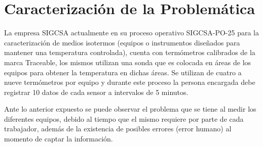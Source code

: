 \section{Caracterización de la Problemática}

\par
La empresa SIGCSA actualmente en su proceso operativo SIGCSA-PO-25 para la caracterización de medios isotermos (equipos o instrumentos diseñados para mantener una temperatura controlada), cuenta con termómetros calibrados de la marca Traceable, los mismos utilizan una sonda que es colocada en áreas de los equipos para obtener la temperatura en dichas áreas. Se utilizan de cuatro a nueve termómetros por equipo y durante este proceso la persona encargada debe registrar 10 datos de cada sensor a intervalos de 5 minutos.

\par \noindent
Ante lo anterior expuesto se puede observar el problema que se tiene al medir los diferentes equipos, debido al tiempo que el mismo requiere por parte de cada trabajador, además de la existencia de posibles errores (error humano) al momento de captar la información.

